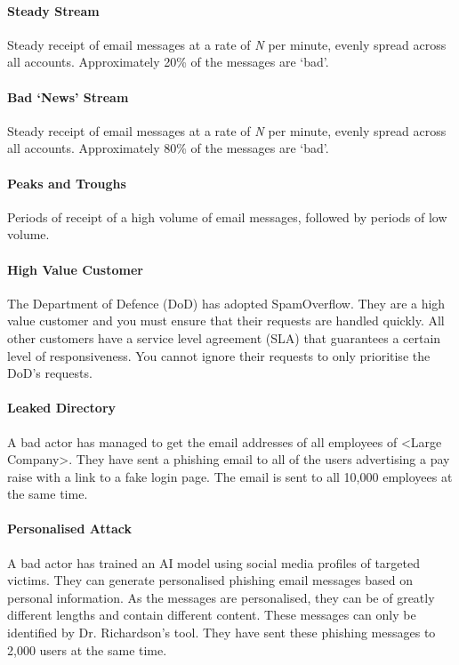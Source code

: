 \documentclass{csse4400}
\begin{document}
\paragraph{Steady Stream}
Steady receipt of email messages at a rate of \emph{N} per minute, evenly spread across all accounts. Approximately 20\% of the messages are `bad'.

\paragraph{Bad `News' Stream}
Steady receipt of email messages at a rate of \emph{N} per minute, evenly spread across all accounts. Approximately 80\% of the messages are `bad'.

\paragraph{Peaks and Troughs}
Periods of receipt of a high volume of email messages, followed by periods of low volume.

\paragraph{High Value Customer}
The Department of Defence (DoD) has adopted SpamOverflow.
They are a high value customer and you must ensure that their requests are handled quickly.
All other customers have a service level agreement (SLA) that guarantees a certain level of responsiveness.
You cannot ignore their requests to only prioritise the DoD's requests.

\paragraph{Leaked Directory}
A bad actor has managed to get the email addresses of all employees of <Large Company>. They have sent a phishing email to all of the users advertising a pay raise with a link to a fake login page. The email is sent to all 10,000 employees at the same time.

\paragraph{Personalised Attack}
A bad actor has trained an AI model using social media profiles of targeted victims.
They can generate personalised phishing email messages based on personal information.
As the messages are personalised, they can be of greatly different lengths and contain different content.
These messages can only be identified by Dr. Richardson's tool.
They have sent these phishing messages to 2,000 users at the same time.
\end{document}
